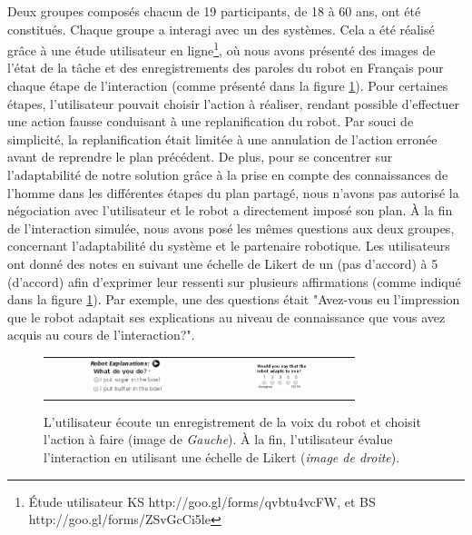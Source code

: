 \documentclass[a4paper,11pt,twoside]{StyleThese}
\begin{document}
Deux groupes composés chacun de 19 participants, de 18 à 60 ans, ont été constitués. Chaque groupe a interagi avec un des systèmes. Cela a été réalisé grâce à une étude utilisateur en ligne\footnote{Étude utilisateur KS http://goo.gl/forms/qvbtu4vcFW, et BS http://goo.gl/forms/ZSvGcCi5le}, où nous avons présenté des images de l'état de la tâche et des enregistrements des paroles du robot en Français pour chaque étape de l'interaction (comme présenté dans la figure \ref{fig:user_study}).
Pour certaines étapes, l'utilisateur pouvait choisir l'action à réaliser, rendant possible d'effectuer une action fausse conduisant à une replanification du robot. Par souci de simplicité, la replanification était limitée à une annulation de l'action erronée avant de reprendre le plan précédent. De plus, pour se concentrer sur l'adaptabilité de notre solution grâce à la prise en compte des connaissances de l'homme dans les différentes étapes du plan partagé, nous n'avons pas autorisé la négociation avec l'utilisateur et le robot a directement imposé son plan.
À la fin de l'interaction simulée, nous avons posé les mêmes questions aux deux groupes, concernant l'adaptabilité du système et le partenaire robotique.
Les utilisateurs ont donné des notes en suivant une échelle de Likert de un (pas d'accord) à 5 (d'accord) afin d'exprimer leur ressenti sur plusieurs affirmations (comme indiqué dans la figure \ref{fig:user_study}).
Par exemple, une des questions était "Avez-vous eu l'impression que le robot adaptait ses explications au niveau de connaissance que vous avez acquis au cours de l'interaction?".

\begin{figure}[ht!]
 \centering
 \begin{tabular}{cc}
  \includegraphics[width=0.48\textwidth]{img/ustudy9.png} &
  \includegraphics[width=0.38\textwidth]{img/ustudy11.png}
 \end{tabular}
 \caption{L'utilisateur écoute un enregistrement de la voix du robot et choisit l'action à faire (image de \textit{Gauche}). À la fin, l'utilisateur évalue l'interaction en utilisant une échelle de Likert (\textit{image de droite}).}
 \label{fig:user_study}
 \end{figure}
\end{document}
